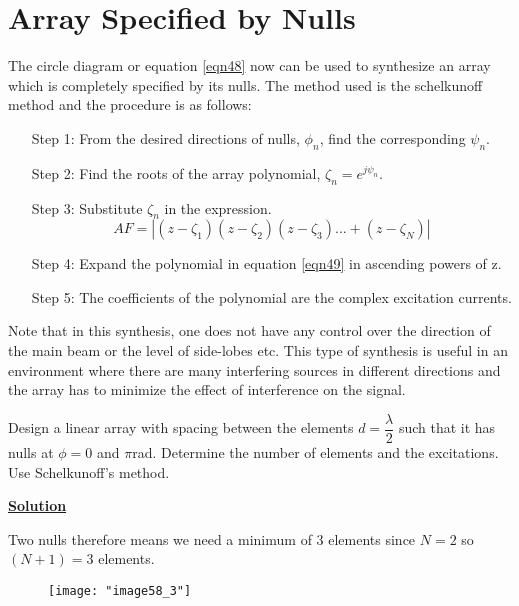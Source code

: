 	\section{Array Specified by Nulls}
	The circle diagram or equation \ref{eqn48} now can be used to synthesize an array which is completely specified by its nulls. The method used is the schelkunoff method and the procedure is as follows: 
	
	\begin{enumerate}
		\item[Step 1:] From the desired directions of nulls, $\phi_{n}$, find the corresponding $\psi_{n}$.
		
		\item[Step 2:] Find the roots of the array polynomial, $\zeta
		_n = e^{j\psi_{n}}$.
		
		\item[Step 3:] Substitute $\zeta_n$ in the expression.
					   \begin{equation}
					   		AF=|(z-\zeta_1)(z-\zeta_2)(z-\zeta_3)...+(z-\zeta_N)|
					   		\label{eqn49}
					   \end{equation}
		
		\item[Step 4:] Expand the polynomial in equation \ref{eqn49} in ascending powers of z.
		
		\item[Step 5:] The coefficients of the polynomial are the complex excitation currents.
	\end{enumerate}
	
	Note that in this synthesis, one does not have any control over the direction of the main beam or the level of side-lobes etc. This type of synthesis is useful in an environment where there are many interfering sources in different directions and the array has to minimize the effect of interference on the signal.\\
	
	\begin{exmp}
		 Design a linear array with spacing between the elements  $d=\dfrac{\lambda}{2}$ such that it has nulls at $\phi=0$ and $\pi$rad. Determine the number of elements and the excitations. Use Schelkunoff's method.
	\end{exmp}
	\begin{center}
	\textbf{\underline{Solution}}
	\end{center}
	Two nulls therefore means we need a minimum of 3 elements since $N=2$ so $(N+1)=3$ elements.
	\begin{figure}[H]
	 	\centering
		\texttt{[image: "image58\_3"]}
		\caption{}
		\label{fig:fig}
	\end{figure}
	
